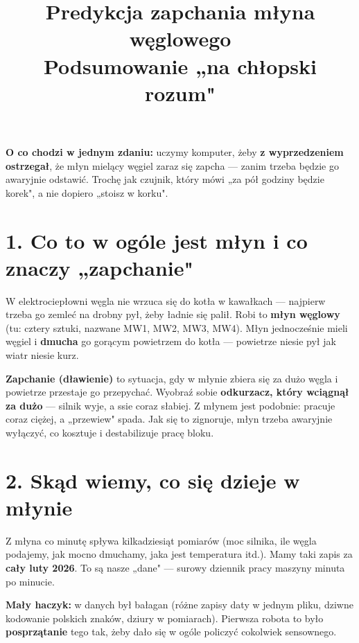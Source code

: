 \documentclass[12pt,a4paper]{article}
\title{\vspace{-1.5cm}\textbf{Predykcja zapchania młyna węglowego}\\[2pt]
\large Podsumowanie „na chłopski rozum"}
\author{}
\date{}
\newcommand{\waz}[1]{\textcolor{akcent}{\textbf{#1}}}
\begin{document}
\maketitle
\vspace{-1.2cm}

\begin{infobox}
\textbf{O co chodzi w jednym zdaniu:} uczymy komputer, żeby \waz{z wyprzedzeniem
ostrzegał}, że młyn mielący węgiel zaraz się zapcha --- zanim trzeba będzie go
awaryjnie odstawić. Trochę jak czujnik, który mówi „za pół godziny będzie korek",
a nie dopiero „stoisz w korku".
\end{infobox}

\section*{1. Co to w ogóle jest młyn i co znaczy „zapchanie"}

W elektrociepłowni węgla nie wrzuca się do kotła w kawałkach --- najpierw trzeba
go zemleć na drobny pył, żeby ładnie się palił. Robi to \waz{młyn węglowy}
(tu: cztery sztuki, nazwane MW1, MW2, MW3, MW4). Młyn jednocześnie mieli węgiel
i \waz{dmucha} go gorącym powietrzem do kotła --- powietrze niesie pył jak wiatr
niesie kurz.

\waz{Zapchanie (dławienie)} to sytuacja, gdy w młynie zbiera się za dużo węgla
i powietrze przestaje go przepychać. Wyobraź sobie \waz{odkurzacz, który wciągnął
za dużo} --- silnik wyje, a ssie coraz słabiej. Z młynem jest podobnie: pracuje
coraz ciężej, a „przewiew" spada. Jak się to zignoruje, młyn trzeba awaryjnie
wyłączyć, co kosztuje i destabilizuje pracę bloku.

\section*{2. Skąd wiemy, co się dzieje w młynie}

Z młyna co minutę spływa kilkadziesiąt pomiarów (moc silnika, ile węgla podajemy,
jak mocno dmuchamy, jaka jest temperatura itd.). Mamy taki zapis za \waz{cały luty
2026}. To są nasze „dane" --- surowy dziennik pracy maszyny minuta po minucie.

\begin{infobox}
\textbf{Mały haczyk:} w danych był bałagan (różne zapisy daty w jednym pliku, dziwne
kodowanie polskich znaków, dziury w pomiarach). Pierwsza robota to było
\waz{posprzątanie} tego tak, żeby dało się w ogóle policzyć cokolwiek sensownego.
\end{infobox}
\end{document}
